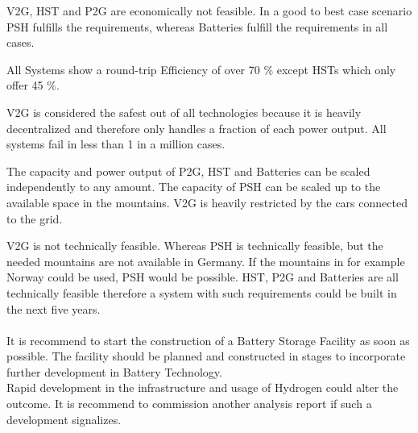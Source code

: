 \begin{parcolumns}[colwidths={1=2.5 cm, 2=10 cm, 3=2.5cm}]{3}
{\noindent V2G, HST and P2G are economically not feasible. In a good to best case scenario PSH fulfills the requirements, whereas Batteries fulfill the requirements in all cases.

\noindent All Systems show a round-trip Efficiency of over 70 $\%$ except HSTs which only offer 45 $\%$. 

\noindent V2G is considered the safest out of all technologies because it is heavily decentralized and therefore only handles a fraction of each power output. All systems fail in less than 1 in a million cases. 

\noindent The capacity and power output of P2G, HST and Batteries can be scaled independently to any amount. The capacity of PSH can be scaled up to the available space in the mountains. V2G is heavily restricted by the cars connected to the grid. 

\noindent V2G is not technically feasible. Whereas PSH is technically feasible, but the needed mountains are not available in Germany. If the mountains in for example Norway could be used, PSH would be possible. HST, P2G and Batteries are all technically feasible therefore a system with such requirements could be built in the next five years. \\ \\
\noindent
It is recommend to start the construction of a Battery Storage Facility as soon as possible. The facility should be planned and constructed in stages to incorporate further development in Battery Technology. \\
\noindent 
Rapid development in the infrastructure and usage of Hydrogen could alter the outcome. It is recommend to commission another analysis report if such a development signalizes. \\

}
\end{parcolumns}
